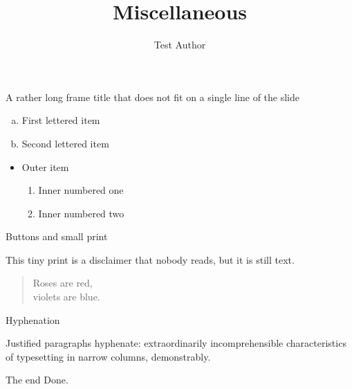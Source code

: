 \documentclass{beamer}
\title{Miscellaneous}
\author{Test Author}
\begin{document}
\begin{frame}{A rather long frame title that does not fit on a single line of the slide}
  \begin{enumerate}[a)]
    \item First lettered item
    \item Second lettered item
  \end{enumerate}
  \begin{itemize}
    \item Outer item
    \begin{enumerate}
      \item Inner numbered one
      \item Inner numbered two
    \end{enumerate}
  \end{itemize}
\end{frame}

\begin{frame}{Buttons and small print}
  \hyperlink{last}{}

  \vspace{1em}
  {\tiny This tiny print is a disclaimer that nobody reads, but it is still text.}

  \begin{verse}
    Roses are red,\\
    violets are blue.
  \end{verse}
\end{frame}

\begin{frame}{Hyphenation}
  \parbox{4.3cm}{Justified paragraphs hyphenate: extraordinarily incomprehensible
    characteristics of typesetting in narrow columns, demonstrably.}
\end{frame}

\begin{frame}[label=last]{The end}
  \centering\Large Done.
\end{frame}
\end{document}
